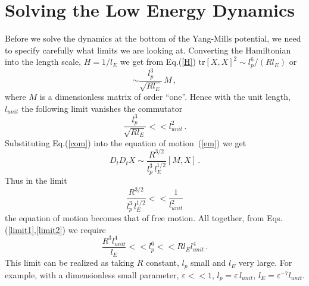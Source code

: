 \documentclass[a4paper,12pt]{article}
\def\tr{\mbox{tr}}
\begin{document}
\section{Solving the Low Energy Dynamics}
Before we solve the dynamics  at the bottom of the Yang-Mills potential, we need to specify carefully what limits
we are looking at. Converting the Hamiltonian into the length scale, $H=1/l_{E}$  we get from Eq.(\ref{H})
$\tr[X,X]^{2}\sim l_{p}^{6}{/(Rl_{E})}$ or
\begin{equation}
[X,X]\sim\frac{l_{p}^{3}}{\sqrt{Rl_{E}}}\,M\,, \label{com}
\end{equation}
where $M$ is a dimensionless matrix of order ``one''. Hence with the unit length, $l_{unit}$   the following limit
vanishes the commutator
\begin{equation}
\frac{l_{p}^{3}}{\sqrt{Rl_{E}}}<<l_{unit}^{2}\,.
\label{limit1}
\end{equation}
Substituting Eq.(\ref{com}) into the equation of motion~(\ref{em}) we get
\begin{equation}
D_{t}D_{t}X\sim\frac{R^{3/2}}{l_{p}^{3}\,l_{E}^{1/2}}[M,X]\,.
\end{equation}
Thus in the limit
\begin{equation}
\frac{R^{3/2}}{l_{p}^{3}\,l_{E}^{1/2}}<<\frac{1}{l_{unit}^{2}}
\label{limit2}
\end{equation}
the equation of motion  becomes that of free motion.  All together, from Eqs.(\ref{limit1},\ref{limit2}) we
require
\begin{equation}
\frac{R^{3}l_{unit}^{4}}{l_{E}}<<l_{p}^{6}<<Rl_{E}l_{unit}^{4}\,.
\end{equation}
This  limit can be realized  as taking $R$ constant,  $l_{p}$ small and $l_{E}$ very large. For example, with a dimensionless  small parameter, $\varepsilon<< 1$,  $l_{p}=\varepsilon\,l_{unit}$, $l_{E}=\varepsilon^{-7}l_{unit}$.\newline
\end{document}
